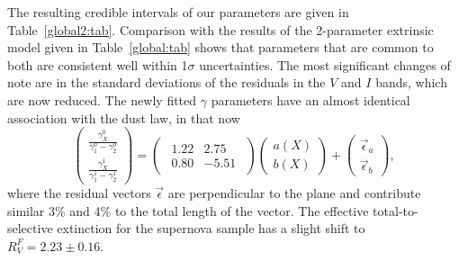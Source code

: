 \documentclass{aastex61}   	%
\begin{document}
The resulting credible intervals of our parameters are given in Table~\ref{global2:tab}.  Comparison with the
results of the 2-parameter extrinsic model given in Table~\ref{global:tab} shows that  parameters that are common to both
are consistent well within 1$\sigma$ uncertainties.  The most significant changes of note are in the standard
deviations of the residuals in the $V$ and $I$ bands, which are now reduced.
The newly fitted $\gamma$ parameters have an almost identical association with the   dust law, in that now
\begin{equation}
\begin{pmatrix}
 \frac{\gamma^0_X}{\gamma^0_1-\gamma^0_2} \\
\frac{\gamma^1_X}{\gamma^1_1-\gamma^1_2} 
\end{pmatrix}=
\begin{pmatrix}
\begin{array}{rr}
1.22 & 2.75 \\
0.80 & -5.51
\end{array}
\end{pmatrix} 
\begin{pmatrix}
a(X) \\
b(X)
\end{pmatrix}+
\begin{pmatrix}
\vec{\epsilon}_a \\
\vec{\epsilon}_b
\end{pmatrix},
\end{equation}
where the residual vectors $\vec{\epsilon}$ are perpendicular to the   plane and
contribute similar 3\% and 4\% to the total  length of the vector.
The effective total-to-selective extinction for the supernova sample has a slight shift to $R^F_V=2.23 \pm 0.16$.
\end{document}
